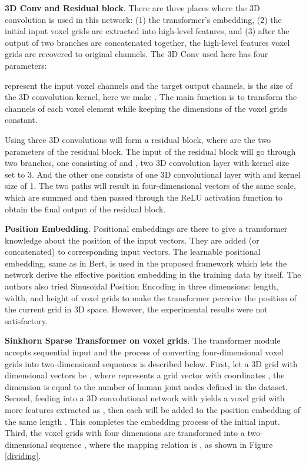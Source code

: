 \documentclass[lettersize,journal]{IEEEtran}
\begin{document}
\textbf{3D Conv and Residual block}.
There are three places where the 3D convolution is used in this network: (1) the transformer's embedding, (2) the initial input voxel grids are extracted into high-level features,  and (3)   after the output of two branches are concatenated together, the high-level features voxel grids are recovered to original channels. The 3D Conv used here has four parameters: 

\par  represent the input voxel channels and the target output channels,  is the size of the 3D convolution kernel,
here we make . The main function is to transform the channels of each voxel element while keeping the dimensions of the voxel grids constant.



\par  Using three 3D convolutions will form a residual block, where  are the two parameters of the residual block. The input of the residual block will go through two branches, one consisting of  and  , two 3D convolution layer with kernel size set to 3. And the other one consists of one 3D convolutional layer with  and kernel size of 1. The two paths will result in four-dimensional vectors of the same scale, which are summed and then passed through the ReLU activation function to obtain the final output of the residual block. 





 \textbf{Position Embedding}. Positional embeddings are there to give a transformer knowledge about the position of the input vectors. They are added (or concatenated) to corresponding input vectors. The learnable positional embedding, same as in Bert\cite{devlin2018bert}, is used in the proposed framework which lets the network derive the effective position embedding in the training data by itself. The authors also tried Sinusoidal Position Encoding in three dimensions: length, width, and height of voxel grids to make the transformer perceive the position of the current grid in 3D space. However, the experimental results were not satisfactory.

 \textbf{Sinkhorn Sparse Transformer on voxel grids}.
The transformer module  accepts sequential input and the process of converting four-dimensional voxel grids into two-dimensional sequences is described below. First, let a  3D grid with  dimensional vectors be , where  represents a grid vector with coordinates , the dimension  is equal to the number of human joint nodes defined in the dataset. Second, feeding  into a 3D convolutional network with  yields a voxel grid with more features extracted as , then each  will be added to the position embedding of the same length . This completes the embedding process of the initial input. Third, the voxel grids with four dimensions  are transformed into a two-dimensional sequence , where the mapping relation  is ,  as shown in Figure \ref{dividing}.
\end{document}
